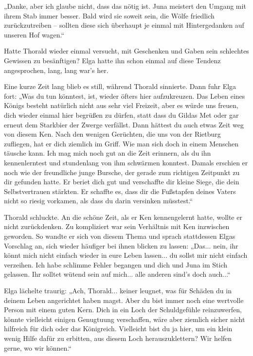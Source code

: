 \documentclass[10pt, a4paper, oneside]{book}
\begin{document}
„Danke, aber ich glaube nicht, dass das nötig ist. Juna meistert den Umgang mit ihrem Stab immer besser. Bald wird sie soweit sein, die Wölfe friedlich zurückzutreiben – sollten diese sich überhaupt je einmal mit Hintergedanken auf unseren Hof wagen.“

Hatte Thorald wieder einmal versucht, mit Geschenken und Gaben sein schlechtes Gewissen zu besänftigen? Elga hatte ihn schon einmal auf diese Tendenz angesprochen, lang, lang war’s her.

Eine kurze Zeit lang blieb es still, während Thorald sinnierte. Dann fuhr Elga fort: „Was du tun könntest, ist, wieder öfters hier aufzukreuzen. Das Leben eines Königs besteht natürlich nicht aus sehr viel Freizeit, aber es würde uns freuen, dich wieder einmal hier begrüßen zu dürfen, statt dass du Gildas Met oder gar erneut dem Starkbier der Zwerge verfällst. Dann hättest du auch etwas Zeit weg von diesem Ken. Nach den wenigen Gerüchten, die uns von der Rietburg zufliegen, hat er dich ziemlich im Griff. Wie man sich doch in einem Menschen täusche kann. Ich mag mich noch gut an die Zeit erinnern, als du ihn kennenlerntest und stundenlang von ihm schwärmen konntest. Damals erschien er noch wie der freundliche junge Bursche, der gerade zum richtigen Zeitpunkt zu dir gefunden hatte. Er beriet dich gut und verschaffte dir kleine Siege, die dein Selbstvertrauen stärkten. Er schaffte es, dass dir die Fußstapfen deines Vaters nicht so riesig vorkamen, als dass du darin versinken müsstest.“

Thorald schluckte. An die schöne Zeit, als er Ken kennengelernt hatte, wollte er nicht zurückdenken. Zu kompliziert war sein Verhältnis mit Ken inzwischen geworden. So wandte er sich von diesem Thema und sprach stattdessen Elgas Vorschlag an, sich wieder häufiger bei ihnen blicken zu lassen: „Das... nein, ihr könnt mich nicht einfach wieder in eure Leben lassen... du sollst mir nicht einfach verzeihen. Ich habe schlimme Fehler begangen und dich und Juna im Stich gelassen. Ihr solltet wütend sein auf mich... alle anderen sind’s doch auch...“

Elga lächelte traurig: „Ach, Thorald... keiner leugnet, was für Schäden du in deinem Leben angerichtet haben magst. Aber du bist immer noch eine wertvolle Person mit einem guten Kern. Dich in ein Loch der Schuldgefühle reinzuwerfen, könnte vielleicht einigen Genugtuung verschaffen, wäre aber ziemlich sicher nicht hilfreich für dich oder das Königreich. Vielleicht bist du ja hier, um ein klein wenig Hilfe dafür zu erbitten, aus diesem Loch herauszuklettern? Wir helfen gerne, wo wir können.“
\end{document}
